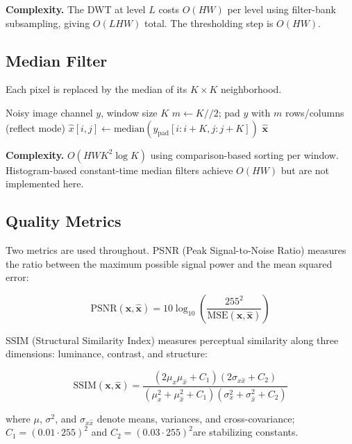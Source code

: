 \documentclass[conference]{IEEEtran}
\begin{document}
\textbf{Complexity.} The DWT at level $L$ costs $O(HW)$ per level using filter-bank subsampling, giving $O(LHW)$ total. The thresholding step is $O(HW)$.

\subsection{Median Filter}

Each pixel is replaced by the median of its $K \times K$ neighborhood.

\begin{algorithm}
\caption{Median Filter}
\begin{algorithmic}[1]
\Require Noisy image channel $y$, window size $K$
\State $m \leftarrow K // 2$; pad $y$ with $m$ rows/columns (reflect mode)
  \State $\hat{x}[i,j] \leftarrow \text{median}(y_{\text{pad}}[i:i+K, j:j+K])$
\EndFor
\State \Return $\hat{\mathbf{x}}$
\end{algorithmic}
\end{algorithm}

\textbf{Complexity.} $O(HW K^2 \log K)$ using comparison-based sorting per window. Histogram-based constant-time median filters achieve $O(HW)$ but are not implemented here.

\subsection{Quality Metrics}

Two metrics are used throughout. PSNR (Peak Signal-to-Noise Ratio) measures the ratio between the maximum possible signal power and the mean squared error:

\begin{equation}
  \text{PSNR}(\mathbf{x}, \hat{\mathbf{x}}) =
    10 \log_{10}\!\left(\frac{255^2}{\text{MSE}(\mathbf{x}, \hat{\mathbf{x}})}\right)
  \label{eq:psnr}
\end{equation}

SSIM (Structural Similarity Index) measures perceptual similarity along three dimensions: luminance, contrast, and structure:

\begin{equation}
  \text{SSIM}(\mathbf{x}, \hat{\mathbf{x}}) =
    \frac{(2\mu_x \mu_{\hat{x}} + C_1)(2\sigma_{x\hat{x}} + C_2)}
         {(\mu_x^2 + \mu_{\hat{x}}^2 + C_1)(\sigma_x^2 + \sigma_{\hat{x}}^2 + C_2)}
  \label{eq:ssim}
\end{equation}

where $\mu$, $\sigma^2$, and $\sigma_{x\hat{x}}$ denote means, variances, and cross-covariance; $C_1 = (0.01 \cdot 255)^2$ and $C_2 = (0.03 \cdot 255)^2$are stabilizing constants.
\end{document}

